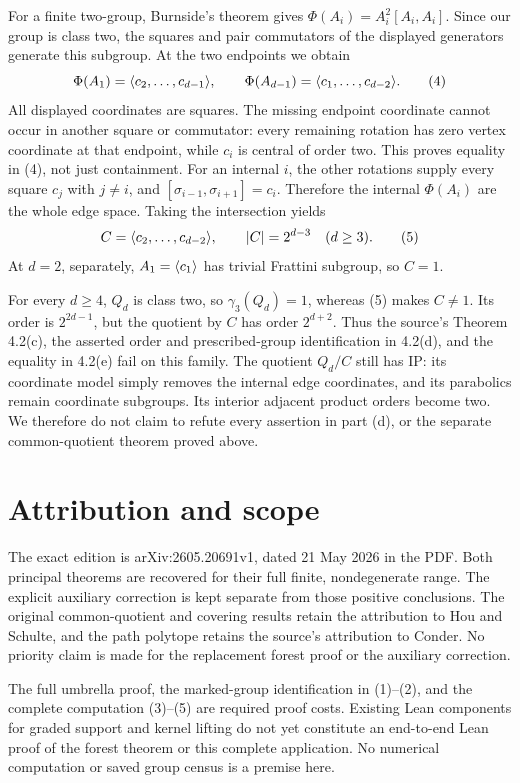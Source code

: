 For a finite two-group, Burnside's theorem gives
$\Phi(A_i)=A_i^2[A_i,A_i]$. Since our group is class two, the squares
and pair commutators of the displayed generators generate this subgroup.
At the two endpoints we obtain
\[
 \Phi(A_1)=\langle c_2,\ldots,c_{d-1}\rangle,\qquad
 \Phi(A_{d-1})=\langle c_1,\ldots,c_{d-2}\rangle.                  \tag{4}
\]
All displayed coordinates are squares. The missing endpoint coordinate
cannot occur in another square or commutator: every remaining rotation
has zero vertex coordinate at that endpoint, while $c_i$ is central of
order two. This proves equality in (4), not just containment.
For an internal $i$, the other rotations supply every square $c_j$ with
$j\ne i$, and
$[\sigma_{i-1},\sigma_{i+1}]=c_i$. Therefore the internal $\Phi(A_i)$
are the whole edge space. Taking the intersection yields
\[
 C=\langle c_2,\ldots,c_{d-2}\rangle,\qquad |C|=2^{d-3}
       \quad(d\ge3).                                     \tag{5}
\]
At $d=2$, separately, $A_1=\langle c_1\rangle$ has trivial Frattini subgroup,
so $C=1$.

For every $d\ge4$, $Q_d$ is class two, so $\gamma_3(Q_d)=1$, whereas
(5) makes $C\ne1$. Its order is $2^{2d-1}$, but the quotient by $C$
has order $2^{d+2}$. Thus the source's Theorem 4.2(c), the asserted order
and prescribed-group identification in 4.2(d), and the equality in 4.2(e)
fail on this family. The quotient $Q_d/C$ still has IP: its coordinate
model simply removes the internal edge coordinates, and its parabolics
remain coordinate subgroups. Its interior adjacent product orders become
two. We therefore do not claim to refute every assertion in part (d),
or the separate common-quotient theorem proved above.

\section{Attribution and scope}
The exact edition is arXiv:2605.20691v1, dated 21 May 2026 in the PDF.
Both principal theorems are recovered for their full finite, nondegenerate
range. The explicit auxiliary correction is kept separate from those
positive conclusions. The original common-quotient and covering results
retain the attribution to Hou and Schulte, and the path polytope retains
the source's attribution to Conder. No priority claim is made for the
replacement forest proof or the auxiliary correction.

The full umbrella proof, the marked-group identification in (1)--(2), and
the complete computation (3)--(5) are required proof costs. Existing Lean
components for graded support and kernel lifting do not yet constitute an
end-to-end Lean proof of the forest theorem or this complete application.
No numerical computation or saved group census is a premise here.


